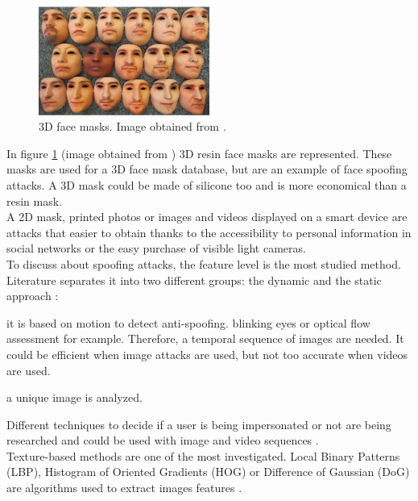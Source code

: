 \begin{figure}[htb]
\centering
\includegraphics[width=0.5\textwidth]{images_miscelaneus/fig_masks.png}
\caption{3D face masks. Image obtained from \cite{3dmask}.} \label{fig:3dMasks}
\end{figure}

In figure \ref{fig:3dMasks} (image obtained from \cite{3dmask}) 3D resin face masks  are represented. These masks are used for a 3D face mask database, but are an example of face spoofing attacks. A 3D mask could be made of silicone too and is more economical than a resin mask.\\

A 2D mask, printed photos or images and videos displayed on a smart device are attacks that easier to obtain thanks to the accessibility to personal information in social networks or the easy purchase of visible light cameras.\\


To discuss about spoofing attacks, the feature level is the most studied method. Literature separates it into two different groups: the dynamic and the static approach \cite{Spoofing_survey}:
\begin{description}[itemsep=2pt,topsep=8pt,parsep=0pt,partopsep=20pt]
\item[Dynamic:] it is based on motion to detect anti-spoofing. blinking eyes or optical flow assessment for example. Therefore, a temporal sequence of images are needed. It could be efficient when image attacks are used, but not too accurate when videos are used.
\item[Static:] a unique image is analyzed.
\end{description}

Different techniques to decide if a user is being impersonated or not are being researched and could be used with image and video sequences \cite{Spoofing_survey}.\\

Texture-based methods are one of the most investigated. Local Binary Patterns (LBP),  Histogram of Oriented Gradients (HOG) or Difference of Gaussian (DoG) are algorithms used to extract images features \cite{distorsion,Spoofing_survey}.\\

